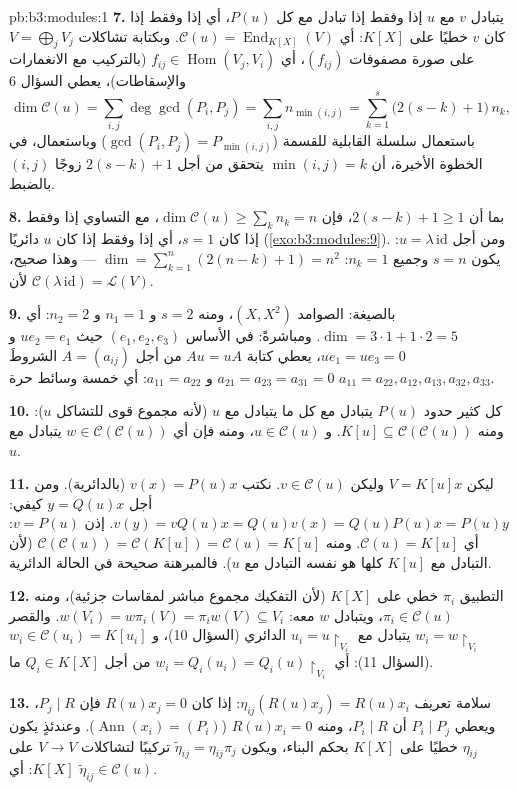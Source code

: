 \begin{solution}{pb:b3:modules:1}
\textbf{7.} يتبادل $v$ مع $u$ إذا وفقط إذا تبادل مع كل $P(u)$،
أي إذا وفقط إذا كان $v$ خطيًا على $K[X]$: أي $\mathcal C(u) =
\operatorname{End}_{K[X]}(V)$. وبكتابة
تشاكلات $V =
\bigoplus_j V_j$ على صورة مصفوفات $(f_{ij})$، أي $f_{ij} \in
\operatorname{Hom}(V_j, V_i)$ (بالتركيب
مع الانغمارات والإسقاطات)، يعطي السؤال 6
\[
\dim \mathcal C(u) = \sum_{i,j} \deg\gcd(P_i, P_j)
= \sum_{i,j} n_{\min(i,j)}
= \sum_{k=1}^{s} \bigl(2(s - k) + 1\bigr)\,n_k ,
\]
باستعمال سلسلة القابلية للقسمة ($\gcd(P_i, P_j) =
P_{\min(i,j)}$) وباستعمال، في الخطوة
الأخيرة، أن $\min(i,j) = k$ يتحقق من أجل $2(s - k) + 1$ زوجًا
$(i, j)$ بالضبط.

\textbf{8.} بما أن $2(s-k)+1 \geq 1$، فإن $\dim\mathcal C(u) \geq
\sum_k n_k = n$، مع التساوي إذا وفقط إذا
كان $s = 1$، أي إذا وفقط إذا كان $u$ دائريًا (\cref{exo:b3:modules:9}). ومن
أجل $u = \lambda\,\mathrm{id}$: يكون $s = n$ وجميع $n_k = 1$: $\dim = \sum_{k=1}^n (2(n-k)+1) = n^2$ --- وهذا
صحيح، لأن $\mathcal C(\lambda\,\mathrm{id}) = \mathcal
L(V)$.

\textbf{9.} بالصيغة: الصوامد $(X, X^2)$، ومنه $s = 2$ و $n_1 =
1$
و $n_2 = 2$: أي $\dim = 3\cdot1 + 1\cdot2 = 5$. ومباشرةً: في الأساس $(e_1, e_2, e_3)$ حيث
$u e_2 = e_1$ و $ue_1 = ue_3 = 0$، يعطي كتابة $Au = uA$ من أجل
$A = (a_{ij})$ الشروطَ $a_{21} = a_{23} = a_{31} = 0$ و $a_{11} = a_{22}$: أي خمسة وسائط حرة
$a_{11}{=}a_{22}, a_{12}, a_{13}, a_{32}, a_{33}$.

\textbf{10.} كل كثير حدود $P(u)$ يتبادل مع كل ما يتبادل مع $u$
(لأنه مجموع قوى للتشاكل $u$): ومنه $K[u]
\subseteq \mathcal C(\mathcal C(u))$. و $u \in \mathcal C(u)$، ومنه فإن أي
$w \in \mathcal C(\mathcal C(u))$ يتبادل مع $u$.

\textbf{11.} ليكن $V = K[u]x$ وليكن $v \in \mathcal C(u)$. نكتب $v(x) = P(u)x$
(بالدائرية). ومن أجل $y = Q(u)x$ كيفي: $v(y) =
vQ(u)x = Q(u)v(x) = Q(u)P(u)x = P(u)y$. إذن $v = P(u)$:
أي $\mathcal
C(u) = K[u]$. ومنه $\mathcal C(\mathcal C(u)) = \mathcal
C(K[u]) = \mathcal C(u) = K[u]$ (لأن التبادل مع $K[u]$ كلها هو نفسه
التبادل مع $u$). فالمبرهنة صحيحة في الحالة الدائرية.

\textbf{12.} التطبيق $\pi_i$ خطي على $K[X]$ (لأن التفكيك مجموع
مباشر لمقاسات جزئية)، ومنه $\pi_i \in \mathcal C(u)$، ويتبادل $w$ معه: $w(V_i) = w\pi_i(V) = \pi_i w(V) \subseteq
V_i$.
والقصر $w_i = w\restriction_{V_i}$ يتبادل مع $u_i = u\restriction_{V_i}$ الدائري (السؤال 10)، و $w_i
\in \mathcal C(u_i) = K[u_i]$
(السؤال 11): أي $w_i = Q_i(u_i) =
Q_i(u)\restriction_{V_i}$ من أجل $Q_i \in K[X]$ ما.

\textbf{13.} سلامة تعريف $\eta_{ij}(R(u)x_j) = R(u)x_i$: إذا كان $R(u)x_j = 0$ فإن
$P_j \mid R$، ويعطي $P_i \mid P_j$ أن $P_i \mid R$، ومنه
$R(u)x_i = 0$ ($\operatorname{Ann}(x_i) =
(P_i)$). وعندئذٍ يكون $\eta_{ij}$ خطيًا على
$K[X]$ بحكم البناء، ويكون $\tilde\eta_{ij} = \eta_{ij}\pi_j$ تركيبًا لتشاكلات $V \to V$ على
$K[X]$: أي $\tilde\eta_{ij} \in \mathcal
C(u)$.


\end{solution}
